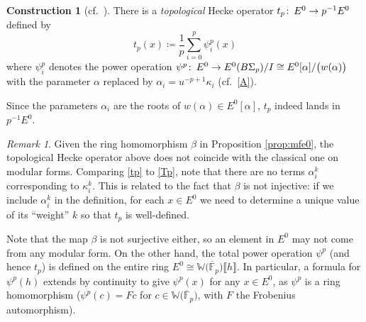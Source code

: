 \documentclass{gtpart}
\theoremstyle{definition}
\newtheorem{cstr}[thm]{Construction}
\theoremstyle{remark}
\newtheorem{rmk}[thm]{Remark}
\def\co{\colon\thinspace}
\newcommand{\mb}[1]{\mathbb{#1}}
\newcommand{\cF}{\overline {\mb F}}
\newcommand{\BW}{{\mb W}}
\newcommand{\A}{\alpha}
\newcommand{\B}{\beta}
\newcommand{\K}{\kappa}
\newcommand{\ce}{\coloneqq}
\newcommand{\lb}{\llbracket}
\newcommand{\rb}{\rrbracket}
\renewcommand{\=}{\approx}
\renewcommand{\-}{\sim}
\numberwithin{equation}{section}
\numberwithin{thm}{section}
\begin{document}
\begin{cstr}[{cf.~\cite[1.12]{log}}]
 There is a {\em topological} Hecke operator $t_p \co E^0 \to p^{-1} E^0$ 
 defined by 
 \begin{equation}
  \label{tp}
  t_p(x) \ce \frac{1}{p} \sum_{i = 0}^p \psi^p_i(x) 
 \end{equation}
 where $\psi^p_i$ denotes the power operation 
 $\psi^p \co E^0 \to E^0(B\Sigma_p) / I \cong E^0[\A] / \big( w(\A) \big)$ with 
 the parameter $\A$ replaced by $\A_i = u^{-p + 1} \K_i$ (cf.~\eqref{A}).  
\end{cstr}

Since the parameters $\A_i$ are the roots of $w(\A) \in E^0[\A]$, $t_p$ indeed 
lands in $p^{-1} E^0$.  

\begin{rmk}
 \label{rmk:tc}
 Given the ring homomorphism $\B$ in Proposition \ref{prop:mfe0}, the 
 topological Hecke operator above does not coincide with the classical one on 
 modular forms.  Comparing \eqref{tp} to \eqref{Tp}, note that there are no 
 terms $\A_i^k$ corresponding to $\K_i^k$.  This is related to the fact that 
 $\B$ is not injective: if we include $\A_i^k$ in the definition, for each 
 $x \in E^0$ we need to determine a unique value of its ``weight'' $k$ so that 
 $t_p$ is well-defined.  

 Note that the map $\B$ is not surjective either, so an element in $E^0$ may not 
 come from any modular form.  On the other hand, the total power operation 
 $\psi^p$ (and hence $t_p$) is defined on the entire ring 
 $E^0 \cong \BW \big( \cF_p \big) \lb h \rb$.  In particular, a formula for 
 $\psi^p(h)$ extends by continuity to give $\psi^p(x)$ for any $x \in E^0$, as 
 $\psi^p$ is a ring homomorphism ($\psi^p(c) = F c$ for 
 $c \in \BW \big( \cF_p \big)$, with $F$ the Frobenius automorphism).  
\end{rmk}
\end{document}
